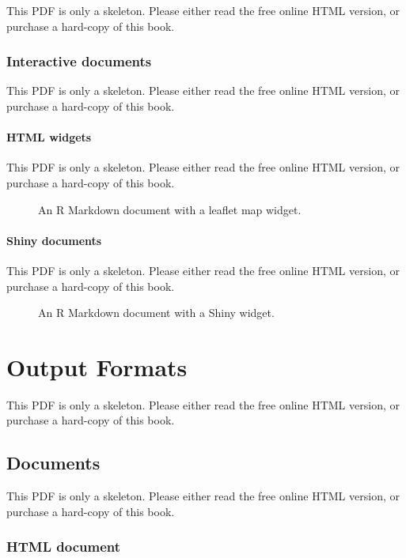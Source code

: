 \documentclass[
  11pt,
]{krantz}
\theoremstyle{definition}
\theoremstyle{definition}
\theoremstyle{definition}
\theoremstyle{definition}
\theoremstyle{remark}
\begin{document}
This PDF is only a skeleton. Please either read the free online HTML version, or purchase a hard-copy of this book.

\section{Interactive documents}\label{interactive-documents}

This PDF is only a skeleton. Please either read the free online HTML version, or purchase a hard-copy of this book.

\subsection{HTML widgets}\label{intro-widgets}

This PDF is only a skeleton. Please either read the free online HTML version, or purchase a hard-copy of this book.

\begin{figure}\caption{An R Markdown document with a leaflet map widget.}\end{figure}

\subsection{Shiny documents}\label{intro-shiny}

This PDF is only a skeleton. Please either read the free online HTML version, or purchase a hard-copy of this book.

\begin{figure}\caption{An R Markdown document with a Shiny widget.}\end{figure}

\part{Output Formats}\label{part-output-formats}

This PDF is only a skeleton. Please either read the free online HTML version, or purchase a hard-copy of this book.

\chapter{Documents}\label{documents}

This PDF is only a skeleton. Please either read the free online HTML version, or purchase a hard-copy of this book.

\section{HTML document}\label{html-document}
\end{document}
